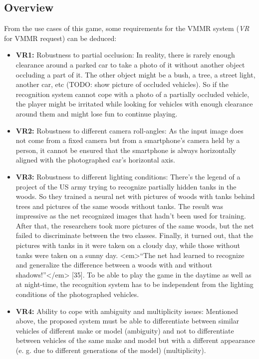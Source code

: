 \subsection{Overview}
From the use cases of this game, some requirements for the VMMR system (\emph{VR} for VMMR request) can be deduced:
\begin{itemize}
  \item\textbf{VR1:} Robustness to partial occlusion: In reality, there is rarely enough clearance around a parked car to take a photo of it without another object occluding a part of it. The other object might be a bush, a tree, a street light, another car, etc (TODO: show picture of occluded vehicles). So if the recognition system cannot cope with a photo of a partially occluded vehicle, the player might be irritated while looking for vehicles with enough clearance around them and might lose fun to continue playing.
  \item\textbf{VR2:} Robustness to different camera roll-angles: As the input image does not come from a fixed camera but from a smartphone’s camera held by a person, it cannot be ensured that the smartphone is always horizontally aligned with the photographed car’s horizontal axis.
  \item\textbf{VR3:} Robustness to different lighting conditions: There's the legend of a project of the US army trying to recognize partially hidden tanks in the woods. So they trained a neural net with pictures of woods with tanks behind trees and pictures of the same woods without tanks. The result was impressive as the net recognized images that hadn't been used for training. After that, the researchers took more pictures of the same woods, but the net failed to discriminate between the two classes. Finally, it turned out, that the pictures with tanks in it were taken on a cloudy day, while those without tanks were taken on a sunny day. <em>“The net had learned to recognize and generalize the difference between a woods with and without shadows!”</em> [35]. To be able to play the game in the daytime as well as at night-time, the recognition system has to be independent from the lighting conditions of the photographed vehicles.
  \item\textbf{VR4:} Ability to cope with ambiguity and multiplicity issues: Mentioned above, the proposed system must be able to differentiate between similar vehicles of different make or model (ambiguity) and not to differentiate between vehicles of the same make and model but with a different appearance (e. g. due to different generations of the model) (multiplicity).
\end{itemize}
